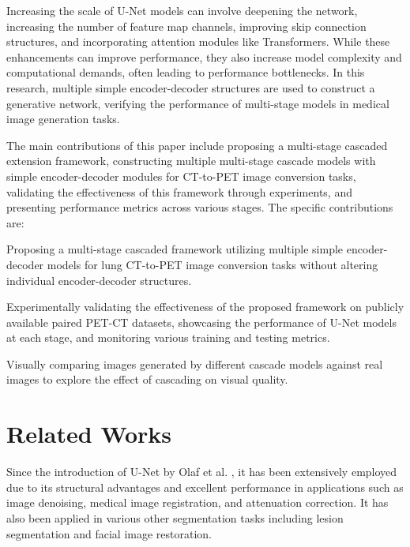 \documentclass[a4paper, times, 10pt,twocolumn]{article}
\begin{document}
Increasing the scale of U-Net models can involve deepening the network, increasing the number of feature map channels, improving skip connection structures, and incorporating attention modules like Transformers. While these enhancements can improve performance, they also increase model complexity and computational demands, often leading to performance bottlenecks. In this research, multiple simple encoder-decoder structures are used to construct a generative network, verifying the performance of multi-stage models in medical image generation tasks.

The main contributions of this paper include proposing a multi-stage cascaded extension framework, constructing multiple multi-stage cascade models with simple encoder-decoder modules for CT-to-PET image conversion tasks, validating the effectiveness of this framework through experiments, and presenting performance metrics across various stages. The specific contributions are:

Proposing a multi-stage cascaded framework utilizing multiple simple encoder-decoder models for lung CT-to-PET image conversion tasks without altering individual encoder-decoder structures.

Experimentally validating the effectiveness of the proposed framework on publicly available paired PET-CT datasets, showcasing the performance of U-Net models at each stage, and monitoring various training and testing metrics.

Visually comparing images generated by different cascade models against real images to explore the effect of cascading on visual quality.

\section{Related Works}
Since the introduction of U-Net by Olaf et al. \cite{navab_u-net_2015}, it has been extensively employed due to its structural advantages and excellent performance in applications such as image denoising, medical image registration, and attenuation correction. It has also been applied in various other segmentation tasks including lesion segmentation and facial image restoration.
\end{document}

